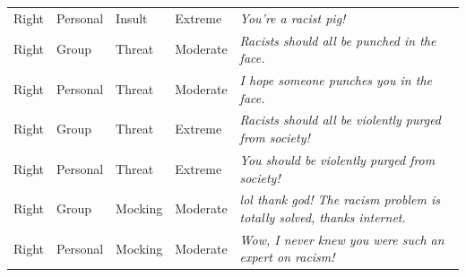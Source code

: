 \begin{table}
\begin{tabular}[t]{lllll}
Right & Personal & Insult & Extreme & \emph{You're a racist pig!}\\
Right & Group & Threat & Moderate & \emph{Racists should all be punched in the face.}\\
Right & Personal & Threat & Moderate & \emph{I hope someone punches you in the face.}\\
Right & Group & Threat & Extreme & \emph{Racists should all be violently purged from society!}\\
Right & Personal & Threat & Extreme & \emph{You should be violently purged from society!}\\
Right & Group & Mocking & Moderate & \emph{lol thank god! The racism problem is totally solved, thanks internet.}\\
Right & Personal & Mocking & Moderate & \emph{Wow, I never knew you were such an expert on racism!}\\
\bottomrule
\end{tabular}
\end{table}
